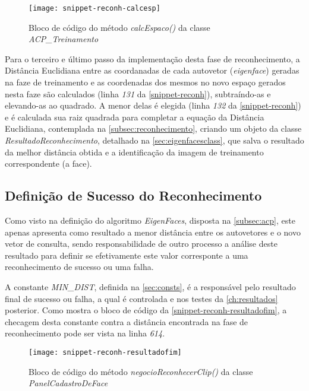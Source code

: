 \begin{figure}[h]
	\centering
	\texttt{[image: snippet-reconh-calcesp]}
	\caption{Bloco de código do método \textit{calcEspaco()} da classe \textit{ACP\_Treinamento}}
	\label{snippet-reconh-calcesp}
\end{figure}


Para o terceiro e último passo da implementação desta fase de reconhecimento, a Distância Euclidiana entre as coordanadas de cada autovetor (\textit{eigenface}) geradas na faze de treinamento e as coordenadas dos mesmos no novo espaço gerados nesta faze são calculados (linha \textit{131} da \autoref{snippet-reconh}), subtraíndo-as e elevando-as ao quadrado. A menor delas é elegida (linha \textit{132} da \autoref{snippet-reconh}) e é calculada sua raiz quadrada para completar a equação da Distância Euclidiana, contemplada na \autoref{subsec:reconhecimento}, criando um objeto da classe \textit{ResultadoReconhecimento}, detalhado na \autoref{sec:eigenfacesclass}, que salva o resultado da melhor distância obtida e a identificação da imagem de treinamento correspondente (a face).


\subsection{Definição de Sucesso do Reconhecimento}\label{sec:defsucregoc}

Como visto na definição do algoritmo \textit{EigenFaces}, disposta na \autoref{subsec:acp}, este apenas apresenta como resultado a menor distância entre os autovetores e o novo vetor de consulta, sendo responsabilidade de outro processo a análise deste resultado para definir se efetivamente este valor corresponte a uma reconhecimento de sucesso ou uma falha.

A constante \textit{MIN\_DIST}, definida na \autoref{sec:consts}, é a responsável pelo resultado final de sucesso ou falha, a qual é controlada e nos testes da \autoref{ch:resultados} posterior. Como mostra o bloco de código da \autoref{snippet-reconh-resultadofim}, a checagem desta constante contra a distância encontrada na fase de reconhecimento pode ser vista na linha \textit{614}.

\begin{figure}[h]
	\centering
	\texttt{[image: snippet-reconh-resultadofim]}
	\caption{Bloco de código do método \textit{negocioReconhecerClip()} da classe \textit{PanelCadastroDeFace}}
	\label{snippet-reconh-resultadofim}
\end{figure}

